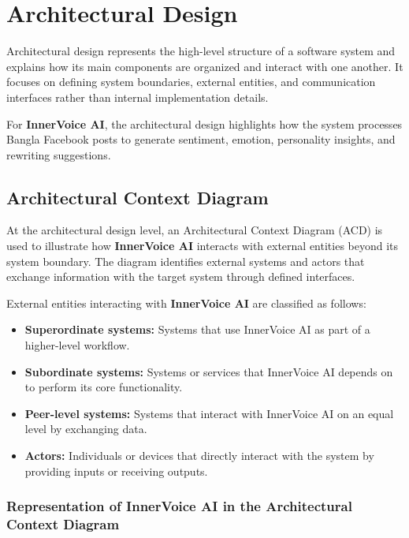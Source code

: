 \documentclass[12pt,a4paper]{report}
\begin{document}
\chapter{Architectural Design}

Architectural design represents the high-level structure of a software system and explains how its main components are organized and interact with one another. It focuses on defining system boundaries, external entities, and communication interfaces rather than internal implementation details.

For \textbf{InnerVoice AI}, the architectural design highlights how the system processes Bangla Facebook posts to generate sentiment, emotion, personality insights, and rewriting suggestions.

\section{Architectural Context Diagram}

At the architectural design level, an Architectural Context Diagram (ACD) is used to illustrate how \textbf{InnerVoice AI} interacts with external entities beyond its system boundary. The diagram identifies external systems and actors that exchange information with the target system through defined interfaces.

External entities interacting with \textbf{InnerVoice AI} are classified as follows:

\begin{itemize}
    \item \textbf{Superordinate systems:} Systems that use InnerVoice AI as part of a higher-level workflow.
    \item \textbf{Subordinate systems:} Systems or services that InnerVoice AI depends on to perform its core functionality.
    \item \textbf{Peer-level systems:} Systems that interact with InnerVoice AI on an equal level by exchanging data.
    \item \textbf{Actors:} Individuals or devices that directly interact with the system by providing inputs or receiving outputs.
\end{itemize}

\subsection{Representation of \textbf{InnerVoice AI} in the Architectural Context Diagram}
\end{document}
